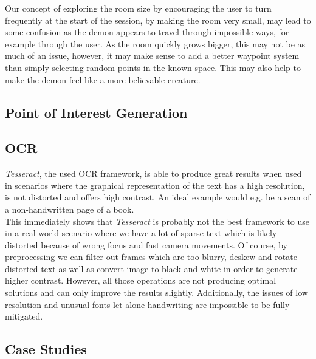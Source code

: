 Our concept of exploring the room size by encouraging the user to turn frequently at the start of the session, by making the room very small, may lead to some confusion as the demon appears to travel through impossible ways, for example through the user.
As the room quickly grows bigger, this may not be as much of an issue, however, it may make sense to add a better waypoint system than simply selecting random points in the known space.
This may also help to make the demon feel like a more believable creature.
\subsection{Point of Interest Generation}

\subsection{OCR}
\emph{Tesseract}, the used OCR framework, is able to produce great results when used in scenarios where the graphical representation of the text has a high resolution, is not distorted and offers high contrast.
An ideal example would e.g. be a scan of a non-handwritten page of a book. \\
This immediately shows that \emph{Tesseract} is probably not the best framework to use in a real-world scenario where we have a lot of sparse text which is likely distorted because of wrong focus and fast camera movements. 
Of course, by preprocessing we can filter out frames which are too blurry, deskew and rotate distorted text as well as convert image to black and white in order to generate higher contrast. 
However, all those operations are not producing optimal solutions and can only improve the results slightly. 
Additionally, the issues of low resolution and unusual fonts let alone handwriting are impossible to be fully mitigated. 

\subsection{Case Studies}

